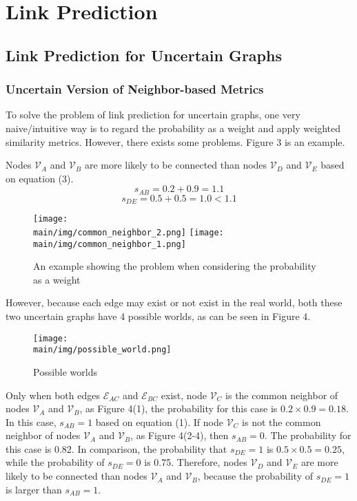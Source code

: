 \documentclass[\main/thesis.tex]{subfiles}
\begin{document}
\chapter{Link Prediction}
\section{Link Prediction for Uncertain Graphs}
\subsection{Uncertain Version of Neighbor-based Metrics}
To solve the problem of link prediction for uncertain graphs, one very naive/intuitive way is to regard the probability as a weight and apply weighted similarity metrics. However, there exists some problems. Figure 3 is an example.

Nodes $\mathcal{V}_A$ and $\mathcal{V}_B$ are more likely to be connected than nodes $\mathcal{V}_D$ and $\mathcal{V}_E$ based on equation (3).
\begin{equation}
s_{AB} = 0.2 + 0.9 = 1.1
\end{equation}
\begin{equation}
s_{DE} = 0.5 + 0.5 = 1.0 < 1.1
\end{equation}

\begin{figure}
\texttt{[image: \\main/img/common\_neighbor\_2.png]}
\texttt{[image: \\main/img/common\_neighbor\_1.png]}
\centering
\caption{An example showing the problem when considering the probability as a weight}
\label{example}
\end{figure}

However, because each edge may exist or not exist in the real world, both these two uncertain graphs have 4 possible worlds, as can be seen in Figure 4.

\begin{figure}
\texttt{[image: \\main/img/possible\_world.png]}
\centering
\caption{Possible worlds}
\label{example}
\end{figure}

Only when both edges $\mathcal{E}_{AC}$ and $\mathcal{E}_{BC}$ exist, node $\mathcal{V}_C$ is the common neighbor of nodes $\mathcal{V}_A$ and $\mathcal{V}_B$, as Figure 4(1), the probability for this case is $0.2\times 0.9=0.18$. In this case, $s_{AB}=1$ based on equation (1). If node $\mathcal{V}_C$ is not the common neighbor of nodes $\mathcal{V}_A$ and $\mathcal{V}_B$, as Figure 4(2-4),  then $s_{AB}=0$. The probability for this case is 0.82. In comparison, the probability that $s_{DE}=1$ is $0.5\times 0.5=0.25$, while the probability of $s_{DE}=0$ is 0.75. Therefore, nodes $\mathcal{V}_D$ and $\mathcal{V}_E$ are more likely to be connected than nodes $\mathcal{V}_A$ and $\mathcal{V}_B$, because the probability of $s_{DE}=1$ is larger than $s_{AB}=1$. 
\end{document}
